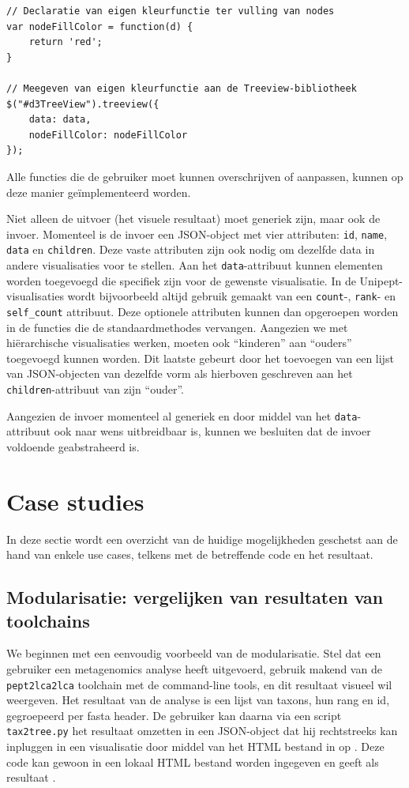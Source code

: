\begin{lstlisting}
// Declaratie van eigen kleurfunctie ter vulling van nodes
var nodeFillColor = function(d) {
    return 'red';
}

// Meegeven van eigen kleurfunctie aan de Treeview-bibliotheek
$("#d3TreeView").treeview({
    data: data,
    nodeFillColor: nodeFillColor
});
\end{lstlisting}

Alle functies die de gebruiker moet kunnen overschrijven of aanpassen,
kunnen op deze manier geïmplementeerd worden.

Niet alleen de uitvoer (het visuele resultaat) moet generiek zijn, maar ook de
invoer. Momenteel is de invoer een JSON-object met vier attributen: \texttt{id},
\texttt{name}, \texttt{data} en \texttt{children}. Deze vaste attributen zijn
ook nodig om dezelfde data in andere visualisaties voor te stellen. Aan het
\texttt{data}-attribuut kunnen elementen worden toegevoegd die specifiek zijn
voor de gewenste visualisatie. In de Unipept-visualisaties wordt bijvoorbeeld
altijd gebruik gemaakt van een \texttt{count}-, \texttt{rank}- en
\texttt{self\_count} attribuut. Deze optionele attributen kunnen dan opgeroepen
worden in de functies die de standaardmethodes vervangen. Aangezien we met
hiërarchische visualisaties werken, moeten ook ``kinderen'' aan ``ouders''
toegevoegd kunnen worden. Dit laatste gebeurt door het toevoegen van een lijst
van JSON-objecten van dezelfde vorm als hierboven geschreven aan het
\texttt{children}-attribuut van zijn ``ouder''.

Aangezien de invoer momenteel al generiek en door middel van het
\texttt{data}-attribuut ook naar wens uitbreidbaar is, kunnen we besluiten dat
de invoer voldoende geabstraheerd is.

\section{Case studies}
\label{sec:voorbeelden}
In deze sectie wordt een overzicht van de huidige mogelijkheden geschetst aan 
de hand van enkele use cases, telkens met de betreffende code en het resultaat. 

\subsection{Modularisatie: vergelijken van resultaten van toolchains}
We beginnen met een eenvoudig voorbeeld van de modularisatie. Stel dat een
gebruiker een metagenomics analyse heeft uitgevoerd, gebruik makend van de
\texttt{pept2lca2lca} toolchain  met de command-line tools, en dit resultaat
visueel wil weergeven. Het resultaat van de analyse is een lijst van taxons, hun
rang en id, gegroepeerd per fasta header. De gebruiker kan daarna via een script
\texttt{tax2tree.py} het resultaat omzetten in een JSON-object dat hij
rechtstreeks kan inpluggen in een visualisatie door middel van het HTML bestand
in  op . Deze code kan gewoon in
een lokaal HTML bestand worden ingegeven en geeft als resultaat
.

